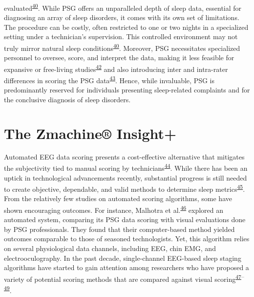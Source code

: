 \documentclass[
  10pt,
]{scrbook}
\begin{document}
evaluated\textsuperscript{\protect\hyperlink{ref-sadeh_2015}{40}}. While
PSG offers an unparalleled depth of sleep data, essential for diagnosing
an array of sleep disorders, it comes with its own set of limitations.
The procedure can be costly, often restricted to one or two nights in a
specialized setting under a technician's supervision. This controlled
environment may not truly mirror natural sleep
conditions\textsuperscript{\protect\hyperlink{ref-sadeh_2015}{40}}.
Moreover, PSG necessitates specialized personnel to oversee, score, and
interpret the data, making it less feasible for expansive or free-living
studies\textsuperscript{\protect\hyperlink{ref-girschik_validation_2012}{42}}
and also introducing inter and intra-rater differences in scoring the
PSG data\textsuperscript{\protect\hyperlink{ref-levendowski_2017}{43}}.
Hence, while invaluable, PSG is predominantly reserved for individuals
presenting sleep-related complaints and for the conclusive diagnosis of
sleep disorders.

\hypertarget{the-zmachine-insight}{%
\section{The Zmachine® Insight+}\label{the-zmachine-insight}}

Automated EEG data scoring presents a cost-effective alternative that
mitigates the subjectivity tied to manual scoring by
technicians\textsuperscript{\protect\hyperlink{ref-redline_2013}{44}}.
While there has been an uptick in technological advancements recently,
substantial progress is still needed to create objective, dependable,
and valid methods to determine sleep
metrics\textsuperscript{\protect\hyperlink{ref-berthomier_2013}{45}}.
From the relatively few studies on automated scoring algorithms, some
have shown encouraging outcomes. For instance, Malhotra et
al.\textsuperscript{\protect\hyperlink{ref-malhotra_2013}{46}} explored
an automated system, comparing its PSG data scoring with visual
evaluations done by PSG professionals. They found that their
computer-based method yielded outcomes comparable to those of seasoned
technologists. Yet, this algorithm relies on several physiological data
channels, including EEG, chin EMG, and electrooculography. In the past
decade, single-channel EEG-based sleep staging algorithms have started
to gain attention among researchers who have proposed a variety of
potential scoring methods that are compared against visual
scoring\textsuperscript{\protect\hyperlink{ref-koley_2012}{47}--\protect\hyperlink{ref-zhu_2014}{49}}.
\end{document}
